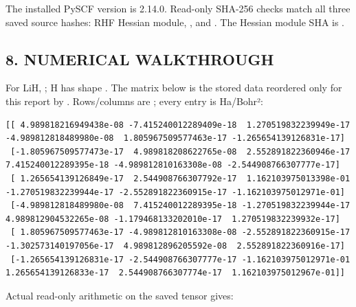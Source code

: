 \documentclass[10pt,a4paper]{article}
\begin{document}
The installed PySCF version is 2.14.0. Read-only  SHA-256 checks match all three saved source hashes: RHF Hessian module, , and . The Hessian module SHA is .

\begin{landscape}
\subsection{8. NUMERICAL WALKTHROUGH}
For LiH, ; H has shape . The matrix below is the stored data reordered only for this report by . Rows/columns are ; every entry is Ha/Bohr²:

\begin{Verbatim}
[[ 4.989818216949438e-08 -7.415240012289409e-18  1.270519832239949e-17 -4.989812818489980e-08  1.805967509577463e-17 -1.265654139126831e-17]
 [-1.805967509577473e-17  4.989818208622765e-08  2.552891822360946e-17  7.415240012289395e-18 -4.989812810163308e-08 -2.544908766307777e-17]
 [ 1.265654139126849e-17  2.544908766307792e-17  1.162103975013398e-01 -1.270519832239944e-17 -2.552891822360915e-17 -1.162103975012971e-01]
 [-4.989812818489980e-08  7.415240012289395e-18 -1.270519832239944e-17  4.989812904532265e-08 -1.179468133202010e-17  1.270519832239932e-17]
 [ 1.805967509577463e-17 -4.989812810163308e-08 -2.552891822360915e-17 -1.302573140197056e-17  4.989812896205592e-08  2.552891822360916e-17]
 [-1.265654139126831e-17 -2.544908766307777e-17 -1.162103975012971e-01  1.265654139126833e-17  2.544908766307774e-17  1.162103975012967e-01]]
\end{Verbatim}
Actual read-only arithmetic on the saved tensor gives:


\end{landscape}
\end{document}
